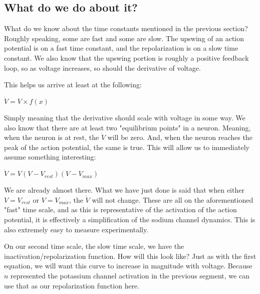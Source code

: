 \documentclass[12pt]{amsart}
\begin{document}
\subsection{What do we do about it?} What do we know about the time constants mentioned in the previous section? Roughly speaking, some are fast and some are slow. The upswing of an action potential is on a fast time constant, and the repolarization is on a slow time constant. We also know that the upswing portion is roughly a positive feedback loop, so as voltage increases, so should the derivative of voltage.\newline

This helps us arrive at least at the following: 

\bigskip

\begin{center}

    $\dot{V} = V \times f(x)$
    
\end{center}

\bigskip

Simply meaning that the derivative should scale with voltage in some way. We also know that there are at least two "equilibrium points" in a neuron. Meaning, when the neuron is at rest, the $\dot{V}$ will be zero. And, when the neuron reaches the peak of the action potential, the same is true. This will allow us to immediately assume something interesting:

\bigskip

\begin{center}

    $\dot{V} = V(V - V_{rest})(V - V_{max})$
    
\end{center}

\bigskip

We are already almost there. What we have just done is said that when either $V = V_{rest}$ or $V = V_{max}$, the $\dot{V}$ will not change. These are all on the aforementioned "fast" time scale, and as this is representative of the activation of the action potential, it is effectively a simplification of the sodium channel dynamics. This is also extremely easy to measure experimentally.\newline

On our second time scale, the slow time scale, we have the inactivation/repolarization function. How will this look like? Just as with the first equation, we will want this curve to increase in magnitude with voltage. Because $n$ represented the potassium channel activation in the previous segment, we can use that as our repolarization function here. 
\end{document}
